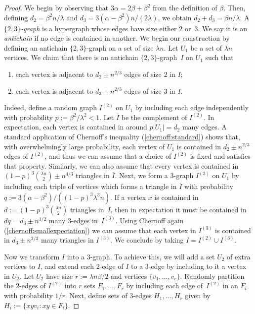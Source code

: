 \documentclass[a4paper, 11pt,reqno]{amsart}
\theoremstyle{plain}
\theoremstyle{definition}
\numberwithin{equation}{section}
\begin{document}
\begin{proof}
	We begin by observing that $3 \alpha = 2 \beta + \beta^2$ 
	from the definition of $\beta$. Then, defining $d_2 = \beta^2n/\lambda$ 
	and $d_3 = 3(\alpha-\beta^2)n/(2\lambda)$, we obtain $d_2 + d_3 = \beta n/\lambda$.
	A \emph{$\{2,3\}$-graph} is a hypergraph whose edges have size either $2$ or~$3$. 
	We say it is an \emph{antichain} if no edge is contained in another.  
	We begin our construction by defining an antichain $\{2,3\}$-graph 
	on a set of size $\lambda n$.  Let $U_1$ be a set of $\lambda n$ vertices.  
	We claim that there is an antichain $\{2,3\}$-graph~$I$ on $U_1$ such that
	\begin{enumerate}[(F1),labelindent=0pt,labelwidth=\widthof{\ref{item:F-3}},leftmargin=!]
		\item \label{item:F-2} each vertex is adjacent to $d_2 \pm n^{2/3}$
		edges of size $2$ in $I$;
		\item \label{item:F-3} each vertex is adjacent to $d_3 \pm n^{2/3}$
		edges of size $3$ in $I$.
	\end{enumerate}
	
	Indeed, define a random graph $I^{(2)}$ on $U_1$ by including each
	edge independently with probability $p := \beta^2/\lambda^2 < 1$.
	Let $\overline{I}$ be the complement of $I^{(2)}$.  In
	expectation, each vertex is contained in around $p |U_1| = d_2$ many
	edges.
	A standard application of Chernoff's inequality (\ref{chernoff:standard}) shows that, with overwhelmingly large probability, each vertex of
	$U_1$ is contained in $d_2 \pm n^{2/3}$ edges of $I^{(2)}$, and thus
	we can assume that a choice of $I^{(2)}$ is fixed and satisfies that
	property. Similarly, we can also assume that every vertex is
	contained in $(1-p)^3 \binom{\lambda n}{2} \pm n^{4/3}$ triangles in
	$\overline{I}$.  Next, we form a $3$-graph $I^{(3)}$ on $U_1$ by including
	each triple of vertices which forms a triangle in $\overline{I}$
	with probability $q := 3 (\alpha - \beta^2) / ((1-p)^3 \lambda^3n)$.  If a vertex $x$ is contained in $d:=(1-p)^3 \binom{\lambda n}{2}$ 
	triangles in~$\overline{I}$, then in expectation it must be
	contained in $dq = d_3 \pm n^{1/2}$ many $3$-edges in~$I^{(3)}$.
	Using Chernoff again (\ref{chernoff:smallexpectation}) we can assume that each vertex in $I^{(3)}$ is contained in 
	$d_3 \pm n^{2/3}$ many triangles in $I^{(3)}$.  
	We conclude by taking $I = I^{(2)} \cup I^{(3)}$.
	
	Now we transform $I$ into a $3$-graph.  To achieve this, we will add
	a set $U_2$ of extra vertices to $I$, and extend each $2$-edge of
	$I$ to a $3$-edge by including to it a vertex in $U_2$.  Let $U_2$
	have size $r := \lambda n \beta / 2$ and vertices $\{v_1, \dotsc,
	v_r \}$.  Randomly partition the $2$-edges of $I^{(2)}$ into $r$
	sets $F_1, \dotsc, F_r$ by including each edge of~$I^{(2)}$ in 
	an $F_i$ with probability $1/r$.  Next, define sets of $3$-edges
	$H_1, \dotsc, H_r$ given by~$H_i := \{ xyv_i : xy \in F_i \}$.
	

\end{proof}
\end{document}
